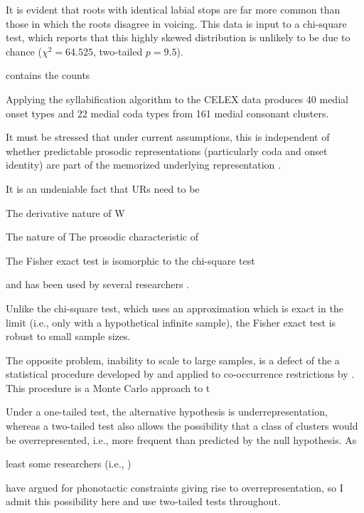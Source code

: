 \noindent
It is evident that roots with identical labial stops are far more common than those in which the roots disagree in voicing. This data is input to a chi-square test, which reports that this highly skewed distribution is unlikely to be due to chance ($\chi^2 = 64.525$, two-tailed $p = 9.5$).  


\citep[see also][]{Gorman2012}
contains the counts 





\citet{Pierrehumbert1994}

Applying the syllabification algorithm to the CELEX data produces 40 medial onset types and 22 medial coda types from 161 medial consonant clusters.

It must be stressed that under current assumptions, this is independent of whether predictable prosodic representations (particularly coda and onset identity) are part of the memorized underlying representation \citep[e.g.,][]{Vaux2003}.

It is an undeniable fact that URs need to be 

The derivative nature of 
W

\citet{Ito1989a,Noske1993}

The nature of 
The prosodic characteristic of

The Fisher exact test is isomorphic to the chi-square test 

and has been used by several researchers \citep{Zuraw2010}.

Unlike the chi-square test, which uses an approximation which is exact in the limit (i.e., only with a hypothetical infinite sample), the Fisher exact test is robust to small sample sizes.

The opposite problem, inability to scale to large samples, is a defect of the a statistical procedure developed by \citet{Kessler2001} and applied to co-occurrence restrictions by \citet{Martin2007,Martin2011}. This procedure is a Monte Carlo approach to t

Under a one-tailed test, the alternative hypothesis is underrepresentation, whereas a two-tailed test also allows the possibility that a class of clusters would be overrepresented, i.e., more frequent than predicted by the null hypothesis. As 

least some researchers (i.e., \citealt{Mester1988}) 

 \citep[e.g.,]{Brown2010} have argued for phonotactic constraints giving rise to overrepresentation, so I admit this possibility here and use two-tailed tests throughout. 


